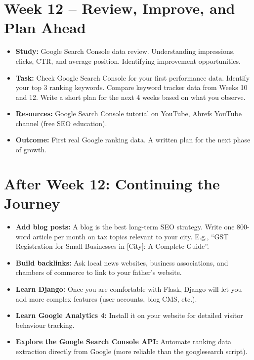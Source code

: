\documentclass[12pt, a4paper]{book}
\begin{document}
\section{Week 12 -- Review, Improve, and Plan Ahead}
\begin{itemize}[leftmargin=1.5em]
  \item \textbf{Study:} Google Search Console data review. Understanding impressions, clicks, CTR,
        and average position. Identifying improvement opportunities.
  \item \textbf{Task:} Check Google Search Console for your first performance data.
        Identify your top 3 ranking keywords. Compare keyword tracker data from Weeks 10 and 12.
        Write a short plan for the next 4 weeks based on what you observe.
  \item \textbf{Resources:} Google Search Console tutorial on YouTube,
        Ahrefs YouTube channel (free SEO education).
  \item \textbf{Outcome:} First real Google ranking data. A written plan for the next phase of growth.
\end{itemize}

\section{After Week 12: Continuing the Journey}

\begin{itemize}[leftmargin=1.5em]
  \item \textbf{Add blog posts:} A blog is the best long-term SEO strategy.
        Write one 800-word article per month on tax topics relevant to your city.
        E.g., ``GST Registration for Small Businesses in [City]: A Complete Guide''.
  \item \textbf{Build backlinks:} Ask local news websites, business associations,
        and chambers of commerce to link to your father's website.
  \item \textbf{Learn Django:} Once you are comfortable with Flask,
        Django will let you add more complex features (user accounts, blog CMS, etc.).
  \item \textbf{Learn Google Analytics 4:} Install it on your website for detailed
        visitor behaviour tracking.
  \item \textbf{Explore the Google Search Console API:} Automate ranking data
        extraction directly from Google (more reliable than the googlesearch script).
\end{itemize}
\end{document}
